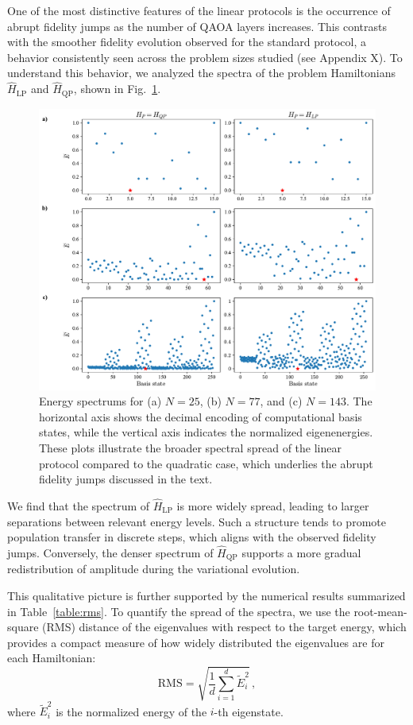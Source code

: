 One of the most distinctive features of the linear protocols is the occurrence of abrupt fidelity jumps as the number of QAOA layers increases. This contrasts with the smoother fidelity evolution observed for the standard protocol, a behavior consistently seen across the problem sizes studied (see Appendix X). To understand this behavior, we analyzed the spectra of the problem Hamiltonians $\hat{H}_\mathrm{LP}$ and $\hat{H}_\mathrm{QP}$, shown in Fig.~\ref{fig:spectrums}.
\begin{figure}[h]
    \centering
    \includegraphics[width=1\textwidth]{05-discussion/figs/energy_spectrums.pdf}
    \caption{Energy spectrums for (a) $N=25$, (b) $N=77$, and (c) $N=143$. The horizontal axis shows the decimal encoding of computational basis states, while the vertical axis indicates the normalized eigenenergies. These plots illustrate the broader spectral spread of the linear protocol compared to the quadratic case, which underlies the abrupt fidelity jumps discussed in the text.}
    \label{fig:spectrums}
\end{figure}
We find that the spectrum of $\hat{H}_\mathrm{LP}$ is more widely spread, leading to larger separations between relevant energy levels. Such a structure tends to promote population transfer in discrete steps, which aligns with the observed fidelity jumps. Conversely, the denser spectrum of $\hat{H}_\mathrm{QP}$ supports a more gradual redistribution of amplitude during the variational evolution.

This qualitative picture is further supported by the numerical results summarized in Table~\ref{table:rms}. To quantify the spread of the spectra, we use the root-mean-square (RMS) distance of the eigenvalues with respect to the target energy, which provides a compact measure of how widely distributed the eigenvalues are for each Hamiltonian:
\begin{equation}
    \textrm{RMS} = \sqrt{\dfrac{1}{d} \sum_{i=1}^{d}\widetilde{E}_i^2}\,,
    \label{eq:rms}
\end{equation}
where $\widetilde{E}_i^2$ is the normalized energy of the $i$-th eigenstate.

